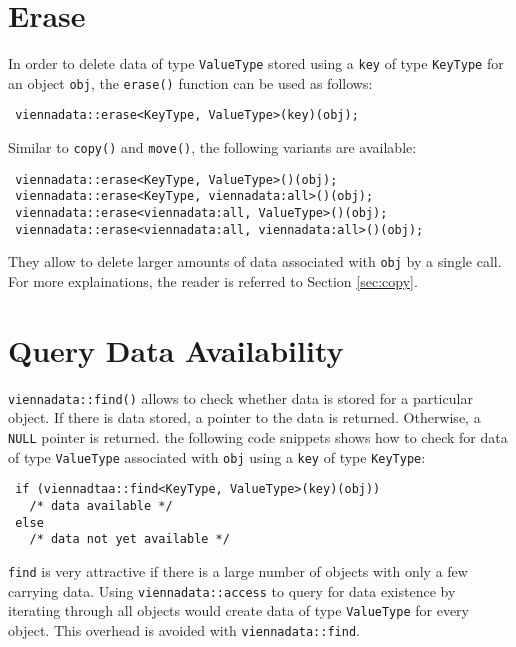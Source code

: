
\section{Erase}
In order to delete data of type \lstinline|ValueType| stored using a \lstinline|key| of type \lstinline|KeyType| for an object \lstinline|obj|,
the \lstinline|erase()| function can be used as follows:
\begin{lstlisting}
 viennadata::erase<KeyType, ValueType>(key)(obj);
\end{lstlisting}
Similar to \lstinline|copy()| and \lstinline|move()|, the following variants are available:
\begin{lstlisting}
 viennadata::erase<KeyType, ValueType>()(obj);
 viennadata::erase<KeyType, viennadata:all>()(obj);
 viennadata::erase<viennadata:all, ValueType>()(obj);
 viennadata::erase<viennadata:all, viennadata:all>()(obj);
\end{lstlisting}
They allow to delete larger amounts of data associated with \lstinline|obj| by a single call.
For more explainations, the reader is referred to Section \ref{sec:copy}.

\section{Query Data Availability}
\lstinline|viennadata::find()| allows to check whether data is stored for a particular object. If there is data stored, a pointer to the data is returned. Otherwise, a \lstinline|NULL| pointer is returned.
the following code snippets shows how to check for data of type \lstinline|ValueType| associated with \lstinline|obj| using a \lstinline|key| of type \lstinline|KeyType|:
\begin{lstlisting}
 if (viennadtaa::find<KeyType, ValueType>(key)(obj))
   /* data available */
 else
   /* data not yet available */
\end{lstlisting}
\lstinline|find| is very attractive if there is a large number of objects with only a few carrying data.
Using \lstinline|viennadata::access| to query for data existence by iterating through all objects would create data of type \lstinline|ValueType| for every object. This overhead is avoided with \lstinline|viennadata::find|.

